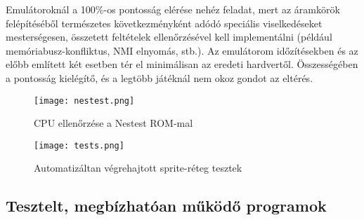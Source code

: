 Emulátoroknál a 100\%-os pontosság elérése nehéz feladat, mert az áramkörök felépítéséből természetes következményként adódó speciális viselkedéseket mesterségesen, összetett feltételek ellenőrzésével kell implementálni (például memóriabusz-konfliktus, NMI elnyomás, stb.).  Az emulátorom időzítésekben és az előbb említett két esetben tér el minimálisan az eredeti hardvertől. Összességében a pontosság kielégítő, és a legtöbb játéknál nem okoz gondot az eltérés.

\vspace{0.2cm}
\begin{figure}[H]
	\centering
	\texttt{[image: nestest.png]}
	\caption{CPU ellenőrzése a Nestest ROM-mal}
\end{figure}


\begin{figure}[H]
	\centering
	\texttt{[image: tests.png]}
	\caption{Automatizáltan végrehajtott sprite-réteg tesztek}
\end{figure}

\subsection{Tesztelt, megbízhatóan működő programok}

